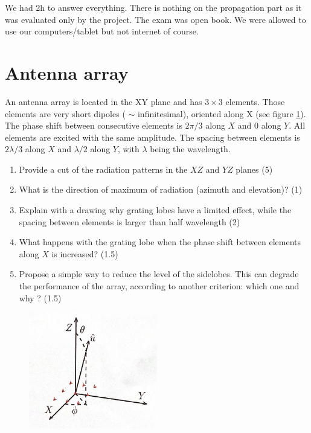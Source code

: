 \documentclass[en]{sourcefiles/eplexam} %
\begin{document}
\noindent We had 2h to answer everything. There is nothing on the propagation part as it was evaluated only by the project. The exam was open book. We were allowed to use our computers/tablet but not internet of course.

\section{Antenna array}
\noindent An antenna array is located in the XY plane and has $3 \times 3$ elements. Those elements are very short dipoles ( $\sim$ infinitesimal), oriented along X (see figure \ref{enonce}). The phase shift between consecutive elements is $2 \pi / 3$ along $X$ and 0 along $Y$. All elements are excited with the same amplitude. The spacing between elements is $2 \lambda / 3$ along $X$ and $\lambda / 2$ along $Y$, with $\lambda$ being the wavelength.

\begin{enumerate}

    \item Provide a cut of the radiation patterns in the $X Z$ and $Y Z$ planes (5)
    \item What is the direction of maximum of radiation (azimuth and elevation)? (1)
    \item Explain with a drawing why grating lobes have a limited effect, while the spacing between elements is larger than half wavelength (2)
    \item What happens with the grating lobe when the phase shift between elements along $X$ is increased? (1.5)
    \item Propose a simple way to reduce the level of the sidelobes. This can degrade the performance of the array, according to another criterion: which one and why ? (1.5)

\end{enumerate}

\begin{figure}[h]
    \centering
    \includegraphics[width=0.5\textwidth]{antennaExamQ1fig.png}
    \caption{}
    \label{enonce}
\end{figure}
\end{document}
